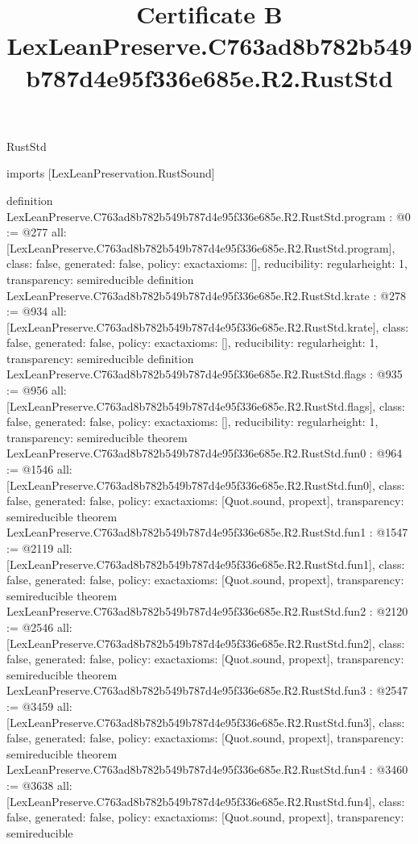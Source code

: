 \begin{lexlean}{RustStd}
\title{Certificate B LexLeanPreserve.C763ad8b782b549b787d4e95f336e685e.R2.RustStd}
\begin{coremodule}
imports [LexLeanPreservation.RustSound]

definition LexLeanPreserve.C763ad8b782b549b787d4e95f336e685e.R2.RustStd.program : @0 := @277 {
  all: [LexLeanPreserve.C763ad8b782b549b787d4e95f336e685e.R2.RustStd.program],
  class: false,
  generated: false,
  policy: exact{axioms: []},
  reducibility: regular{height: 1},
  transparency: semireducible
}
definition LexLeanPreserve.C763ad8b782b549b787d4e95f336e685e.R2.RustStd.krate : @278 := @934 {
  all: [LexLeanPreserve.C763ad8b782b549b787d4e95f336e685e.R2.RustStd.krate],
  class: false,
  generated: false,
  policy: exact{axioms: []},
  reducibility: regular{height: 1},
  transparency: semireducible
}
definition LexLeanPreserve.C763ad8b782b549b787d4e95f336e685e.R2.RustStd.flags : @935 := @956 {
  all: [LexLeanPreserve.C763ad8b782b549b787d4e95f336e685e.R2.RustStd.flags],
  class: false,
  generated: false,
  policy: exact{axioms: []},
  reducibility: regular{height: 1},
  transparency: semireducible
}
theorem LexLeanPreserve.C763ad8b782b549b787d4e95f336e685e.R2.RustStd.fun0 : @964 := @1546 {
  all: [LexLeanPreserve.C763ad8b782b549b787d4e95f336e685e.R2.RustStd.fun0],
  class: false,
  generated: false,
  policy: exact{axioms: [Quot.sound, propext]},
  transparency: semireducible
}
theorem LexLeanPreserve.C763ad8b782b549b787d4e95f336e685e.R2.RustStd.fun1 : @1547 := @2119 {
  all: [LexLeanPreserve.C763ad8b782b549b787d4e95f336e685e.R2.RustStd.fun1],
  class: false,
  generated: false,
  policy: exact{axioms: [Quot.sound, propext]},
  transparency: semireducible
}
theorem LexLeanPreserve.C763ad8b782b549b787d4e95f336e685e.R2.RustStd.fun2 : @2120 := @2546 {
  all: [LexLeanPreserve.C763ad8b782b549b787d4e95f336e685e.R2.RustStd.fun2],
  class: false,
  generated: false,
  policy: exact{axioms: [Quot.sound, propext]},
  transparency: semireducible
}
theorem LexLeanPreserve.C763ad8b782b549b787d4e95f336e685e.R2.RustStd.fun3 : @2547 := @3459 {
  all: [LexLeanPreserve.C763ad8b782b549b787d4e95f336e685e.R2.RustStd.fun3],
  class: false,
  generated: false,
  policy: exact{axioms: [Quot.sound, propext]},
  transparency: semireducible
}
theorem LexLeanPreserve.C763ad8b782b549b787d4e95f336e685e.R2.RustStd.fun4 : @3460 := @3638 {
  all: [LexLeanPreserve.C763ad8b782b549b787d4e95f336e685e.R2.RustStd.fun4],
  class: false,
  generated: false,
  policy: exact{axioms: [Quot.sound, propext]},
  transparency: semireducible
}
\end{coremodule}
\end{lexlean}
